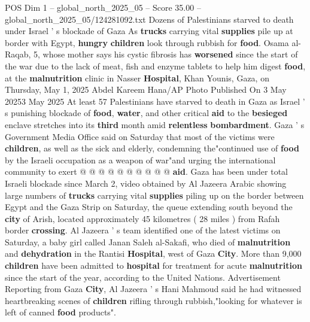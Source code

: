 \begin{textsample}{POS Dim 1 – global\_north\_2025\_05 – Score 35.00 – global\_north\_2025\_05/124281092.txt}  \label{ex:f1_pos_218}
Dozens of Palestinians starved to death under Israel ' s blockade of Gaza As \textbf{trucks} carrying vital \textbf{supplies} pile up at border with Egypt, \textbf{hungry} \textbf{children} look through rubbish for \textbf{food}.
Osama al-Raqab, 5, whose mother says his cystic fibrosis has \textbf{worsened} since the start of the war due to the lack of meat, fish and enzyme tablets to help him digest \textbf{food}, at the \textbf{malnutrition} clinic in Nasser \textbf{Hospital}, Khan Younis, Gaza, on Thursday, May 1, 2025 Abdel Kareem Hana/AP Photo Published On 3 May 20253 May 2025 At least 57 Palestinians have starved to death in Gaza as Israel ' s punishing blockade of \textbf{food}, \textbf{water}, and other critical \textbf{aid} to the \textbf{besieged} enclave stretches into its \textbf{third} month amid \textbf{relentless} \textbf{bombardment}.
Gaza ' s Government Media Office said on Saturday that most of the victims were \textbf{children}, as well as the sick and elderly, condemning the"continued use of \textbf{food} by the Israeli occupation as a weapon of war"and urging the international community to exert @ @ @ @ @ @ @ @ @ @ \textbf{aid}.
Gaza has been under total Israeli blockade since March 2, video obtained by Al Jazeera Arabic showing large numbers of \textbf{trucks} carrying vital \textbf{supplies} piling up on the border between Egypt and the Gaza Strip on Saturday, the queue extending south beyond the \textbf{city} of Arish, located approximately 45 kilometres ( 28 miles ) from Rafah border \textbf{crossing}.
Al Jazeera ' s team identified one of the latest victims on Saturday, a baby girl called Janan Saleh al-Sakafi, who died of \textbf{malnutrition} and \textbf{dehydration} in the Rantisi \textbf{Hospital}, west of Gaza \textbf{City}.
More than 9,000 \textbf{children} have been admitted to \textbf{hospital} for treatment for acute \textbf{malnutrition} since the start of the year, according to the United Nations.
Advertisement Reporting from Gaza \textbf{City}, Al Jazeera ' s Hani Mahmoud said he had witnessed heartbreaking scenes of \textbf{children} rifling through rubbish,"looking for whatever is left of canned \textbf{food} products".

\end{textsample}
